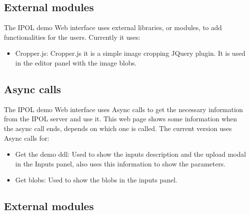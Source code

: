 
\subsection{External modules}

The IPOL demo Web interface uses external libraries, or modules, to add functionalities for the users.
Currently it uses:

\begin{itemize}
\item Cropper.js: Cropper.js it is a simple image cropping JQuery plugin. It is used in the editor panel with the image blobs.
\end{itemize}


\subsection{Async calls}
The IPOL demo Web interface uses Async calls to get the necessary information from the IPOL server and use it.
This web page shows some information when the async call ends, depends on which one is called.
The current version uses Async calls for:
\begin{itemize}
\item Get the demo ddl: Used to show the inputs description and the upload modal in the Inputs panel, also uses this information to show the parameters.
\item Get blobs: Used to show the blobs in the inputs panel.
\end{itemize}



\subsection{External modules}
\subsection{}